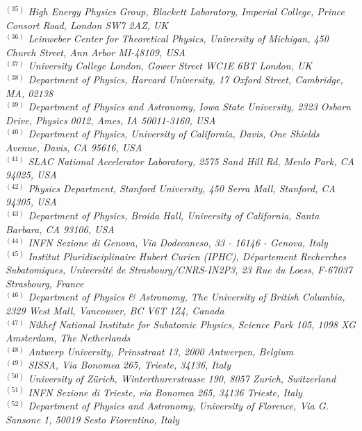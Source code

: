 {\begin{center}
$^{(35)}$ \emph{High Energy Physics Group, Blackett Laboratory, Imperial College, Prince Consort Road, London SW7 2AZ, UK}\\
$^{(36)}$ \emph{Leinweber Center for Theoretical Physics, University of Michigan, 450 Church Street, Ann Arbor MI-48109, USA}\\
$^{(37)}$ \emph{University College London, Gower Street WC1E 6BT London, UK}\\
$^{(38)}$ \emph{Department of Physics, Harvard University, 17 Oxford Street, Cambridge, MA, 02138}\\
$^{(39)}$ \emph{Department of Physics and Astronomy, Iowa State University, 2323 Osborn Drive, Physics 0012, Ames, IA 50011-3160, USA}\\
$^{(40)}$ \emph{Department of Physics, University of California, Davis, One Shields Avenue, Davis, CA 95616, USA}\\
$^{(41)}$ \emph{SLAC National Accelerator Laboratory, 2575 Sand Hill Rd, Menlo Park, CA 94025, USA}\\
$^{(42)}$ \emph{Physics Department, Stanford University, 450 Serra Mall, Stanford, CA 94305, USA}\\
$^{(43)}$ \emph{Department of Physics, Broida Hall, University of California, Santa Barbara, CA 93106, USA}\\
$^{(44)}$ \emph{INFN Sezione di Genova, Via Dodecaneso, 33 - 16146 - Genova, Italy}\\
$^{(45)}$ \emph{Institut Pluridisciplinaire Hubert Curien (IPHC), D\'epartement Recherches Subatomiques, Universit\'e de Strasbourg/CNRS-IN2P3, 23 Rue du Loess, F-67037 Strasbourg, France}\\
$^{(46)}$ \emph{Department of Physics \& Astronomy, The University of British Columbia, 2329 West Mall, Vancouver, BC V6T 1Z4, Canada}\\
$^{(47)}$ \emph{Nikhef National Institute for Subatomic Physics, Science Park 105, 1098 XG Amsterdam, The Netherlands}\\
$^{(48)}$ \emph{Antwerp University, Prinsstraat 13, 2000 Antwerpen, Belgium}\\
$^{(49)}$ \emph{SISSA, Via Bonomea 265, Trieste, 34136, Italy}\\
$^{(50)}$ \emph{University of Z\"urich, Winterthurerstrasse 190, 8057 Zurich, Switzerland}\\
$^{(51)}$ \emph{INFN Sezione di Trieste, via Bonomea 265, 34136 Trieste, Italy}\\
$^{(52)}$ \emph{Department of Physics and Astronomy, University of Florence, Via G. Sansone 1, 50019 Sesto Fiorentino, Italy}\\

\end{center}}
